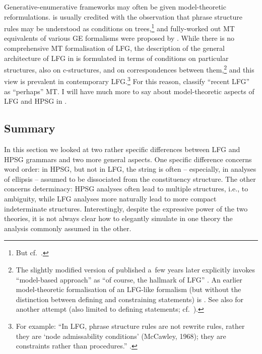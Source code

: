 \documentclass[output=paper,hidelinks]{langscibook}
\begin{document}
\hspace*{-1mm}Generative-enumerative frameworks may often be given model-theoretic reformulations.  \citet{mcca:68} is usually credited with the observation that phrase structure rules may be understood as conditions on trees,\footnote{But cf.~\citet[Section {1.7}]{pull:07}.} and fully-worked out MT equivalents of various GE formalisms were proposed by \citet{roge:97,roge:98}.  While there is no comprehensive MT formalisation of LFG, the description of the general architecture of LFG in \citet[Section {2}]{kapl:89} is formulated in terms of conditions on particular structures, also on c-structures, and on correspondences between them,\footnote{The slightly modified version of \citet{kapl:89} published a~few years later explicitly invokes “model-based approach” as “of course, the hallmark of LFG” \citep[11]{kaplan1995formal}.  An earlier model-theoretic formalisation of an LFG-like formalism (but without the distinction between defining and constraining statements) is \citet{john:88:book}.  See also \citet{blackburn1995a-specification} for another attempt (also limited to defining statements; cf.~\citealt{BorjPayn13}).} and this view is prevalent in contemporary LFG\@.\footnote{For example: “In LFG, phrase structure rules are not rewrite rules, rather they are ‘node admissability conditions’ (McCawley, 1968); they are constraints rather than procedures.” \citep[61]{Snijders2015}.}  For this reason, \citet[20]{pullum2001distinction} classify “recent LFG” as “perhaps” MT\@.  I will have much more to say about model-theoretic aspects of LFG and HPSG in .



\subsection{Summary}
\label{sec:gram:sum}

In this section we looked at two rather specific differences between LFG and HPSG grammars and two more general aspects.  One specific difference concerns word order: in HPSG, but not in LFG, the string is often -- especially, in analyses of ellipsis -- assumed to be dissociated from the constituency structure.  The other concerns determinacy: HPSG analyses often lead to multiple structures, i.e., to ambiguity, while LFG analyses more naturally lead to more compact indeterminate structures.  Interestingly, despite the expressive power of the two theories, it is not always clear how to elegantly simulate in one theory the analysis commonly assumed in the other.
\end{document}

